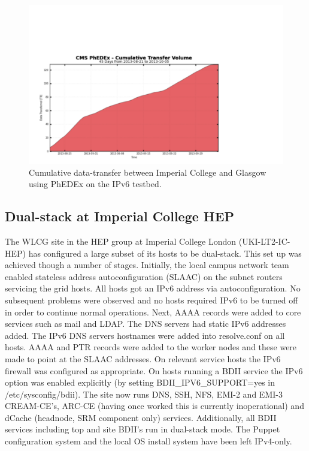 \begin{figure}[htp]
\centering
\includegraphics{phedex-transfer-volume}
\caption{Cumulative data-transfer between Imperial College and Glasgow using PhEDEx on the IPv6 testbed.}\label{fig:phedex-transfer-volume}
\end{figure}

\subsection{Dual-stack at Imperial College HEP}
The WLCG site in the HEP group at Imperial College London (UKI-LT2-IC-HEP) has configured a large subset of its hosts to be dual-stack. 
This set up was achieved though a number of stages. Initially, the local campus network team enabled 
stateless address autoconfiguration (SLAAC) on the subnet routers servicing the grid hosts. All hosts got an IPv6 address via autoconfiguration. 
No subsequent problems were observed and no hosts required IPv6 to be turned off in order to continue normal operations. 
Next, AAAA records were added to core services such as mail and LDAP. The DNS servers had static IPv6 addresses added. 
The IPv6 DNS servers hostnames were added into resolve.conf on all hosts. AAAA and PTR records were added to the worker nodes and these were made to point at the SLAAC addresses. 
On relevant service hosts the IPv6 firewall was configured as appropriate. On hosts running a BDII service the IPv6 option was enabled explicitly 
(by setting BDII\_IPV6\_SUPPORT=yes in /etc/sysconfig/bdii). The site now runs DNS, SSH, NFS, EMI-2 and EMI-3 CREAM-CE's, 
ARC-CE (having once worked this is currently inoperational) and dCache (headnode, SRM component only) services. 
Additionally, all BDII services including top and site BDII's run in dual-stack mode. The Puppet configuration system and the local OS install system have been left IPv4-only.
